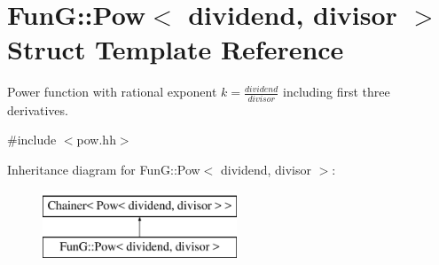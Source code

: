 \hypertarget{structFunG_1_1Pow}{}\section{FunG\+:\+:Pow$<$ dividend, divisor $>$ Struct Template Reference}
\label{structFunG_1_1Pow}


Power function with rational exponent $ k = \frac{dividend}{divisor} $ including first three derivatives.  




{\ttfamily \#include $<$pow.\+hh$>$}

Inheritance diagram for FunG\+:\+:Pow$<$ dividend, divisor $>$\+:\begin{figure}[H]
\begin{center}
\leavevmode
\includegraphics[height=2.000000cm]{structFunG_1_1Pow}
\end{center}
\end{figure}
